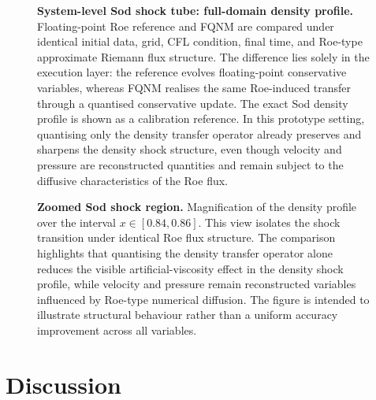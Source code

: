 \documentclass[sn-basic]{sn-jnl}
\theoremstyle{plain}
\theoremstyle{remark}
\begin{document}
\begin{figure}[t]
\centering
{}
\caption{\textbf{System-level Sod shock tube: full-domain density profile.} Floating-point Roe reference and FQNM are compared under identical initial data, grid, CFL condition, final time, and Roe-type approximate Riemann flux structure. The difference lies solely in the execution layer: the reference evolves floating-point conservative variables, whereas FQNM realises the same Roe-induced transfer through a quantised conservative update. The exact Sod density profile is shown as a calibration reference. In this prototype setting, quantising only the density transfer operator already preserves and sharpens the density shock structure, even though velocity and pressure are reconstructed quantities and remain subject to the diffusive characteristics of the Roe flux.}
\label{fig:sod_fd_fqnm_full}
\end{figure}

\begin{figure}[t]
\centering
{}
\caption{\textbf{Zoomed Sod shock region.} Magnification of the density profile over the interval $x\in[0.84,0.86]$. This view isolates the shock transition under identical Roe flux structure. The comparison highlights that quantising the density transfer operator alone reduces the visible artificial-viscosity effect in the density shock profile, while velocity and pressure remain reconstructed variables influenced by Roe-type numerical diffusion. The figure is intended to illustrate structural behaviour rather than a uniform accuracy improvement across all variables.}
\label{fig:sod_fd_fqnm_zoom}
\end{figure}




\section{Discussion}
\label{sec:discussion}
\end{document}

